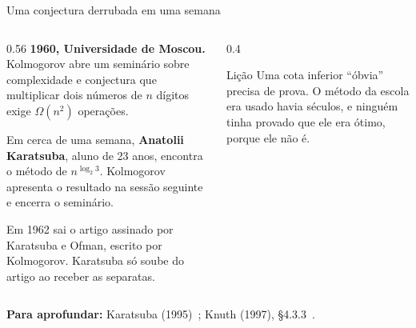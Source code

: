 \documentclass[aspectratio=169,xcolor=table]{beamer}
\newcommand{\fonte}[1]{%
  \vfill
  {\tiny\color{gray!55!black}\textbf{Para aprofundar:} #1\par}%
}
\begin{document}
\begin{frame}{Uma conjectura derrubada em uma semana}
  \begin{columns}[c]
    \begin{column}{0.56\textwidth}
      \scriptsize
      \textbf{1960, Universidade de Moscou.} Kolmogorov abre um seminário sobre complexidade
      e conjectura que multiplicar dois números de $n$ dígitos exige $\Omega(n^2)$ operações.
      \medskip

      Em cerca de uma semana, \textbf{Anatolii Karatsuba}, aluno de 23 anos, encontra o
      método de $n^{\log_2 3}$. Kolmogorov apresenta o resultado na sessão seguinte e
      encerra o seminário.
      \medskip

      Em 1962 sai o artigo assinado por Karatsuba e Ofman, escrito por Kolmogorov. Karatsuba
      só soube do artigo ao receber as separatas.
    \end{column}
    \begin{column}{0.4\textwidth}
      \begin{exampleblock}{Lição}
        \scriptsize Uma cota inferior ``óbvia'' precisa de prova. O método da escola era
        usado havia séculos, e ninguém tinha provado que ele era ótimo, porque ele não é.
      \end{exampleblock}
    \end{column}
  \end{columns}
  \fonte{Karatsuba (1995)~\cite{karatsuba1995complexity};
    Knuth (1997), \S 4.3.3~\cite{knuth1997seminumerical}.}
\end{frame}
\end{document}
